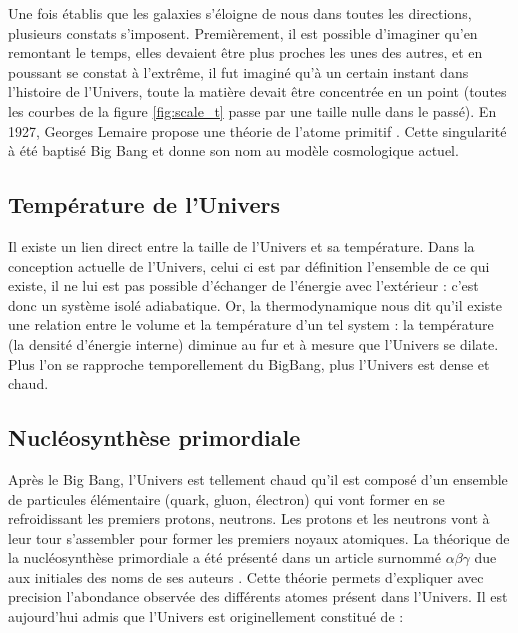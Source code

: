 Une fois établis que les galaxies s'éloigne de nous dans toutes les directions, plusieurs constats s'imposent.
Premièrement, il est possible d'imaginer qu'en remontant le temps, elles devaient être plus proches les unes des autres, et en poussant se constat à l’extrême, il fut imaginé qu'à un certain instant dans l'histoire de l'Univers, toute la matière devait être concentrée en un point (toutes les courbes de la figure \ref{fig:scale_t} passe par une taille nulle dans le passé).
En 1927, Georges Lemaire propose une théorie de l'atome primitif \cite{1927ASSB...47...49L}.
Cette singularité à été baptisé Big Bang et donne son nom au modèle cosmologique actuel.

\subsection{Température de l'Univers}

Il existe un lien direct entre la taille de l'Univers et sa température.
Dans la conception actuelle de l'Univers, celui ci est par définition l'ensemble de ce qui existe, il ne lui est pas possible d'échanger de l’énergie avec l’extérieur : c'est donc un système isolé adiabatique.
Or, la thermodynamique nous dit qu'il existe une relation entre le volume et la température d'un tel system : la température (la densité d'énergie interne) diminue au fur et à mesure que l'Univers se dilate.
Plus l'on se rapproche temporellement du BigBang, plus l'Univers est dense et chaud.

\subsection{Nucléosynthèse primordiale}
\label{sec:nucleosynthese_primordiale}
Après le Big Bang, l'Univers est tellement chaud qu'il est composé d'un ensemble de particules élémentaire (quark, gluon, électron) qui vont former en se refroidissant les premiers protons, neutrons.
Les protons et les neutrons vont à leur tour s'assembler pour former les premiers noyaux atomiques.
La théorique de la nucléosynthèse primordiale a été présenté dans un article surnommé $\alpha \beta \gamma$ due aux initiales des noms de ses auteurs \citep{PhysRev.73.803}.
Cette théorie permets d'expliquer avec precision l'abondance observée des différents atomes présent dans l'Univers.
Il est aujourd'hui admis que l'Univers est originellement constitué de : 

